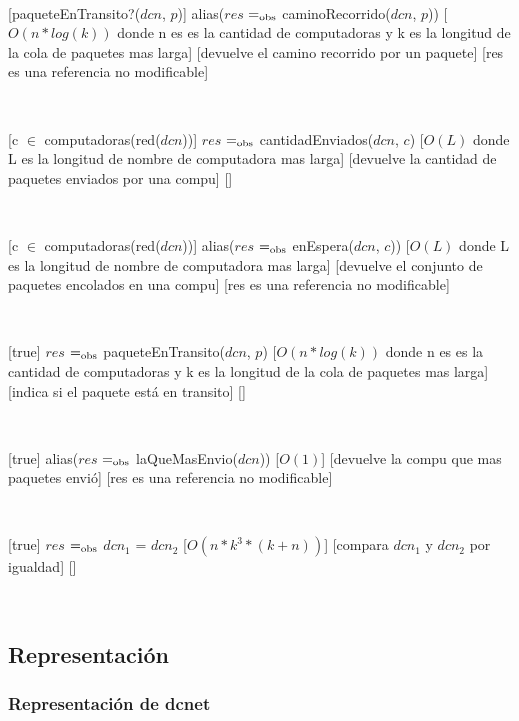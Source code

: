 ~

[paqueteEnTransito?($dcn$, $p$)]
{alias($res$ $=_{\mathrm{obs}}$ caminoRecorrido($dcn$, $p$))}
[$O(n * log(k))$ donde n es es la cantidad de computadoras y k es la longitud de la cola de paquetes mas larga]
[devuelve el camino recorrido por un paquete]
[res es una referencia no modificable]

~

[c $\in$ computadoras(red($dcn$))]
{$res$ $=_{\mathrm{obs}}$ cantidadEnviados($dcn$, $c$)}
[$O(L)$ donde L es la longitud de nombre de computadora mas larga]
[devuelve la cantidad de paquetes enviados por una compu]
[]

~

[c $\in$ computadoras(red($dcn$))]
{alias($res$ $=_{\mathrm{obs}}$ enEspera($dcn$, $c$))}
[$O(L)$ donde L es la longitud de nombre de computadora mas larga]
[devuelve el conjunto de paquetes encolados en una compu]
[res es una referencia no modificable]

~

[true]
{$res$ $=_{\mathrm{obs}}$ paqueteEnTransito($dcn$, $p$)}
[$O(n * log(k))$ donde n es es la cantidad de computadoras y k es la longitud de la cola de paquetes mas larga]
[indica si el paquete está en transito]
[]

~

[true]
{alias($res$ $=_{\mathrm{obs}}$ laQueMasEnvio($dcn$))}
[$O(1)$]
[devuelve la compu que mas paquetes envió]
[res es una referencia no modificable]

~

[true]
{$res$ $=_{\mathrm{obs}}$ $dcn_1$ = $dcn_2$}
[$O(n * k^3 * (k + n))$]
[compara $dcn_1$ y $dcn_2$ por igualdad]
[]

~

\subsection{Representación}

\subsubsection{Representación de dcnet}

